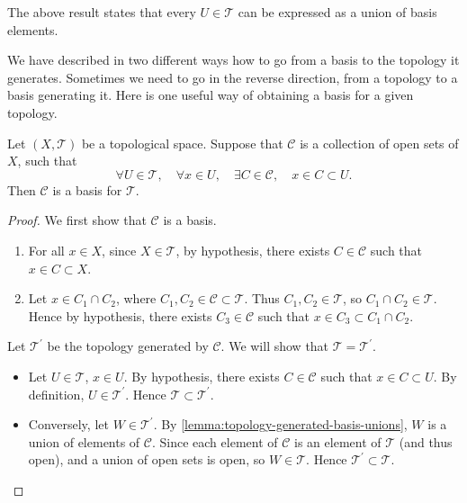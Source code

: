 \begin{remark}
The above result states that every $U\in\mathcal{T}$ can be expressed as a union of basis elements.
\end{remark}

We have described in two different ways how to go from a basis to the topology it generates. Sometimes we need to go in the reverse direction, from a topology to a basis generating it. Here is one useful way of obtaining a basis for a given topology.

\begin{lemma}
Let $(X,\mathcal{T})$ be a topological space. Suppose that $\mathcal{C}$ is a collection of open sets of $X$, such that
\[\forall U\in\mathcal{T},\quad\forall x\in U,\quad\exists C\in\mathcal{C},\quad x\in C\subset U.\]
Then $\mathcal{C}$ is a basis for $\mathcal{T}$.
\end{lemma}

\begin{proof}
We first show that $\mathcal{C}$ is a basis.
\begin{enumerate}[label=(\roman*)]
\item For all $x\in X$, since $X\in\mathcal{T}$, by hypothesis, there exists $C\in\mathcal{C}$ such that $x\in C\subset X$.
\item Let $x\in C_1\cap C_2$, where $C_1,C_2\in\mathcal{C}\subset\mathcal{T}$. Thus $C_1,C_2\in\mathcal{T}$, so $C_1\cap C_2\in\mathcal{T}$. Hence by hypothesis, there exists $C_3\in\mathcal{C}$ such that $x\in C_3\subset C_1\cap C_2$.
\end{enumerate}

Let $\mathcal{T}^\prime$ be the topology generated by $\mathcal{C}$. We will show that $\mathcal{T}=\mathcal{T}^\prime$.
\begin{itemize}
\item Let $U\in\mathcal{T}$, $x\in U$. By hypothesis, there exists $C\in\mathcal{C}$ such that $x\in C\subset U$. By definition, $U\in\mathcal{T}^\prime$. Hence $\mathcal{T}\subset\mathcal{T}^\prime$.
\item Conversely, let $W\in\mathcal{T}^\prime$. By \cref{lemma:topology-generated-basis-unions}, $W$ is a union of elements of $\mathcal{C}$. Since each element of $\mathcal{C}$ is an element of $\mathcal{T}$ (and thus open), and a union of open sets is open, so $W\in\mathcal{T}$. Hence $\mathcal{T}^\prime\subset\mathcal{T}$.
\end{itemize}
\end{proof}

